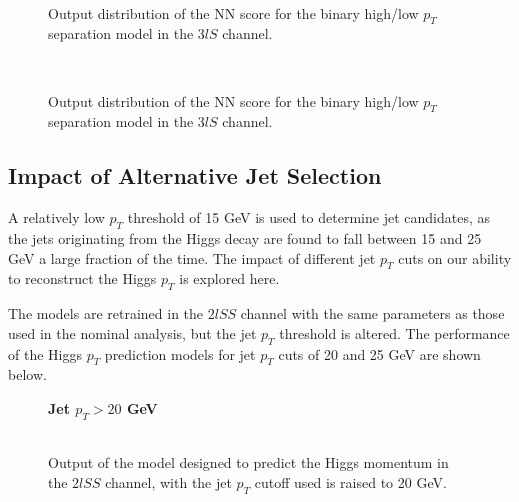 \begin{figure}[H]
  \\                                
  \caption{Output distribution of the NN score for the binary high/low $p_T$ separation model in the $3lS$ channel.}
  \label{fig:bin3lSroc}
\end{figure} 

\begin{figure}[H]
  \\                                
  \caption{Output distribution of the NN score for the binary high/low $p_T$ separation model in the $3lS$ channel.}
  \label{fig:bin3lFroc}
\end{figure} 

\subsection{Impact of Alternative Jet Selection}
\label{subsec:ptCutApx}

A relatively low $p_T$ threshold of 15 GeV is used to determine jet candidates, as the jets originating from the Higgs decay are found to fall between 15 and 25 GeV a large fraction of the time. The impact of different jet $p_T$ cuts on our ability to reconstruct the Higgs $p_T$ is explored here. 

The models are retrained in the $2lSS$ channel with the same parameters as those used in the nominal analysis, but the jet $p_T$ threshold is altered. The performance of the Higgs $p_T$ prediction models for jet $p_T$ cuts of 20 and 25 GeV are shown below.

\begin{figure}[H]
    \centering
    \textbf{Jet $p_T > 20$ GeV}
    \\           
    \\                       
    \caption{Output of the model designed to predict the Higgs momentum in the $2lSS$ channel, with the jet $p_T$ cutoff used is raised to 20 GeV.}
    \label{fig:pt2lSS_20}
\end{figure} 

